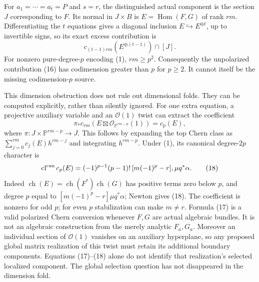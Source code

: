 \documentclass[11pt]{article}
\newcommand{\ch}{\operatorname{ch}}
\newcommand{\Hom}{\operatorname{Hom}}
\begin{document}
For $a_1=\cdots=a_t=P$ and $s=r$, the distinguished actual component is
the section $J$ corresponding to $F$. Its normal in $J\times B$ is
$E=\Hom(F,G)$ of rank $rm$. Differentiating the $t$ equations gives
a diagonal inclusion $E\hookrightarrow E^{\oplus t}$, up to invertible
signs, so its exact excess contribution is
\[
 c_{(t-1)rm}(E^{\oplus(t-1)})\cap[J].                 \tag{16}
\]
For nonzero pure-degree-$p$ encoding (1), $rm\geq p^2$. Consequently
the unpolarized contribution (16) has codimension greater than $p$ for
$p\geq2$. It cannot itself be the missing codimension-$p$ source.

This dimension obstruction does not rule out dimensional folds. They can
be computed explicitly, rather than silently ignored. For one extra
equation, a projective auxiliary variable and an $\mathcal O(1)$ twist
can extract the coefficient
\[
 \pi_*c_{rm}(E\boxtimes\mathcal O_{\mathbb P^{rm-p}}(1))
   =c_p(E),                                           \tag{17}
\]
where $\pi:J\times\mathbb P^{rm-p}\to J$.
This follows by expanding the top Chern class as
$\sum_{j=0}^{rm}c_j(E)h^{rm-j}$ and integrating $h^{rm-p}$.
Under (1), its canonical degree-$2p$ character is
\[
 \operatorname{cl}^{\rm can}c_p(E)
 =(-1)^{p-1}(p-1)!\,[m(-1)^p-r],\mu q^*\alpha.       \tag{18}
\]
Indeed $\ch(E)=\ch(F^*)\ch(G)$ has positive terms zero below $p$,
and degree $p$ equal to $[m(-1)^p-r]\mu q^*\alpha$; Newton gives (18).
The coefficient is nonzero for odd $p$; for even $p$ stabilization can
make $m\ne r$. Formula (17) is a valid polarized Chern conversion whenever
$F,G$ are actual algebraic bundles. It is not an algebraic construction
from the merely analytic $F_a,G_a$. Moreover an individual section of
$\mathcal O(1)$ vanishes on an auxiliary hyperplane, so any proposed
global matrix realization of this twist must retain its additional
boundary components. Equations (17)--(18) alone do not identify that
realization's selected localized component. The global selection question
has not disappeared in the dimension fold.
\end{document}
